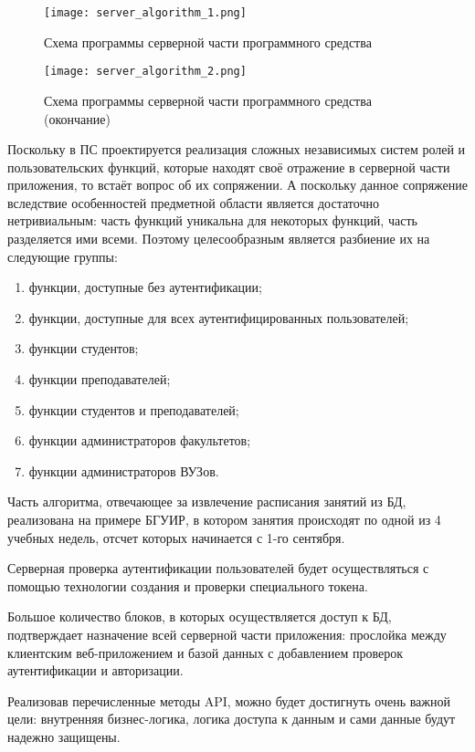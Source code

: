 \begin{sidewaysfigure}
\centering
	\texttt{[image: server\_algorithm\_1.png]}
	\caption{Схема программы серверной части программного средства}
	\label{fig:design:server:interface:server_algorithm}
\end{sidewaysfigure}

\begin{sidewaysfigure}
\ContinuedFloat
\centering
	\texttt{[image: server\_algorithm\_2.png]}
	\caption{Схема программы серверной части программного средства (окончание)}
\end{sidewaysfigure}

Поскольку в ПС проектируется реализация сложных независимых систем ролей и пользовательских функций, которые находят своё отражение в серверной части приложения, то встаёт вопрос об их сопряжении. А поскольку данное сопряжение вследствие особенностей предметной области является достаточно нетривиальным: часть функций уникальна для некоторых функций, часть разделяется ими всеми. Поэтому целесообразным является разбиение их на следующие группы:

\begin{enumerate}
	\item функции, доступные без аутентификации;
	\item функции, доступные для всех аутентифицированных пользователей;
	\item функции студентов;
	\item функции преподавателей;
	\item функции студентов и преподавателей;
	\item функции администраторов факультетов;
	\item функции администраторов ВУЗов.
\end{enumerate}

Часть алгоритма, отвечающее за извлечение расписания занятий из БД, реализована на примере БГУИР, в котором занятия происходят по одной из 4 учебных недель, отсчет которых начинается с 1-го сентября.

Серверная проверка аутентификации пользователей будет осуществляться с помощью технологии создания и проверки специального токена.

Большое количество блоков, в которых осуществляется доступ к БД, подтверждает назначение всей серверной части приложения: прослойка между клиентским веб-приложением и базой данных с добавлением проверок аутентификации и авторизации.

Реализовав перечисленные методы API, можно будет достигнуть очень важной цели: внутренняя бизнес-логика, логика доступа к данным и сами данные будут надежно защищены.

